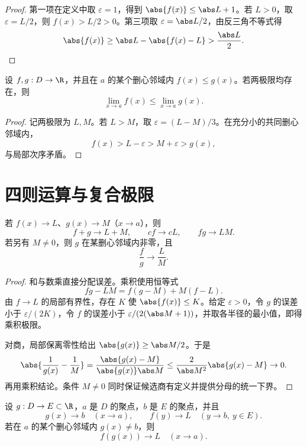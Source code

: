 \begin{proof}
第一项在定义中取 \(\varepsilon=1\)，得到 \(\abs{f(x)}\le\abs L+1\)。若 \(L>0\)，取 \(\varepsilon=L/2\)，则 \(f(x)>L/2>0\)。第三项取 \(\varepsilon=\abs L/2\)，由反三角不等式得
\[
 \abs{f(x)}\ge\abs L-\abs{f(x)-L}>\frac{\abs L}{2}.
\]
\end{proof}

\begin{proposition}[保序性]
设 \(f,g:D\to\R\)，并且在 \(a\) 的某个删心邻域内 \(f(x)\le g(x)\)。若两极限均存在，则
\[
 \lim_{x\to a}f(x)\le\lim_{x\to a}g(x).
\]
\end{proposition}

\begin{proof}
记两极限为 \(L,M\)。若 \(L>M\)，取 \(\varepsilon=(L-M)/3\)。在充分小的共同删心邻域内，
\[
 f(x)>L-\varepsilon>M+\varepsilon>g(x),
\]
与局部次序矛盾。
\end{proof}

\section{四则运算与复合极限}

\begin{theorem}[代数运算]
若 \(f(x)\to L\)、\(g(x)\to M\)（\(x\to a\)），则
\[
 f+g\to L+M,\qquad cf\to cL,\qquad fg\to LM.
\]
若另有 \(M\ne0\)，则 \(g\) 在某删心邻域内非零，且
\[
 \frac{f}{g}\longrightarrow\frac LM.
\]
\end{theorem}

\begin{proof}
和与数乘直接分配误差。乘积使用恒等式
\[
 fg-LM=f(g-M)+M(f-L).
\]
由 \(f\to L\) 的局部有界性，存在 \(K\) 使 \(\abs{f(x)}\le K\)。给定 \(\varepsilon>0\)，令 \(g\) 的误差小于 \(\varepsilon/(2K)\)，令 \(f\) 的误差小于 \(\varepsilon/(2(\abs M+1))\)，并取各半径的最小值，即得乘积极限。

对商，局部保离零性给出 \(\abs{g(x)}\ge\abs M/2\)。于是
\[
 \abs{\frac1{g(x)}-\frac1M}
 =\frac{\abs{g(x)-M}}{\abs{g(x)}\abs M}
 \le\frac{2}{\abs M^2}\abs{g(x)-M}\to0.
\]
再用乘积结论。条件 \(M\ne0\) 同时保证候选商有定义并提供分母的统一下界。
\end{proof}

\begin{theorem}[复合极限]
设 \(g:D\to E\subset\R\)，\(a\) 是 \(D\) 的聚点，\(b\) 是 \(E\) 的聚点，并且
\[
 g(x)\to b\quad(x\to a),\qquad f(y)\to L\quad(y\to b,\ y\in E).
\]
若在 \(a\) 的某个删心邻域内 \(g(x)\ne b\)，则
\[
 f(g(x))\to L\quad(x\to a).
\]
\end{theorem}

